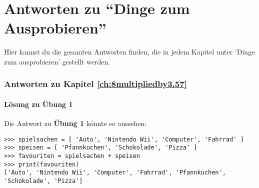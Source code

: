 

\chapter{Antworten zu ``Dinge zum Ausprobieren''}\label{app:answers}

Hier kannst du die gesamten Antworten finden, die in jedem Kapitel unter `Dinge zum ausprobieren' gestellt werden.

\subsection*{Antworten zu Kapitel \ref{ch:8multipliedby3.57}}

\subsubsection{Lösung zu Übung 1}
Die Antwort zu \textbf{Übung 1} könnte so aussehen:

\begin{listing}
\begin{verbatim}
>>> spielsachen = [ 'Auto', 'Nintendo Wii', 'Computer', 'Fahrrad' ]
>>> speisen = [ 'Pfannkuchen', 'Schokolade', 'Pizza' ]
>>> favouriten = spielsachen + speisen
>>> print(favouriten)
['Auto', 'Nintendo Wii', 'Computer', 'Fahrrad', 'Pfannkuchen', 'Schokolade', 'Pizza']
\end{verbatim}
\end{listing}

